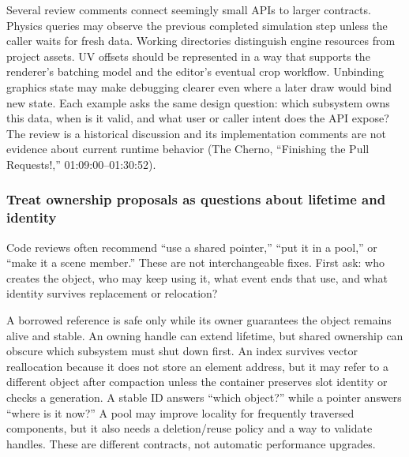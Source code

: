 \hypertarget{05-engine-i-ch014-preserve-ownership-freshness-and-intent-in-engine-apis}{}

Several review comments connect seemingly small APIs to larger contracts. Physics queries may observe the previous completed simulation step unless the caller waits for fresh data. Working directories distinguish engine resources from project assets. UV offsets should be represented in a way that supports the renderer's batching model and the editor's eventual crop workflow. Unbinding graphics state may make debugging clearer even where a later draw would bind new state. Each example asks the same design question: which subsystem owns this data, when is it valid, and what user or caller intent does the API expose? The review is a historical discussion and its implementation comments are not evidence about current runtime behavior (The Cherno, ``Finishing the Pull Requests!,'' 01:09:00--01:30:52).

\subsubsection{Treat ownership proposals as questions about lifetime and identity}\label{05-engine-i-ch014-treat-ownership-proposals-as-questions-about-lifetime-and-identity}

\hypertarget{05-engine-i-ch014-treat-ownership-proposals-as-questions-about-lifetime-and-identity}{}

Code reviews often recommend ``use a shared pointer,'' ``put it in a pool,'' or ``make it a scene member.'' These are not interchangeable fixes. First ask: who creates the object, who may keep using it, what event ends that use, and what identity survives replacement or relocation?

A borrowed reference is safe only while its owner guarantees the object remains alive and stable. An owning handle can extend lifetime, but shared ownership can obscure which subsystem must shut down first. An index survives vector reallocation because it does not store an element address, but it may refer to a different object after compaction unless the container preserves slot identity or checks a generation. A stable ID answers ``which object?'' while a pointer answers ``where is it now?'' A pool may improve locality for frequently traversed components, but it also needs a deletion/reuse policy and a way to validate handles. These are different contracts, not automatic performance upgrades.

